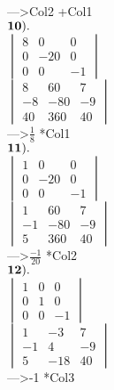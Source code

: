 \documentclass[]{article}
\begin{document}
---\textgreater{}Col2 +Col1\\

\(\bold{10).}\)\\

\(\begin{vmatrix} 8 & 0 & 0\\ 0 & -20 & 0\\ 0 & 0 & -1 \end{vmatrix}\)\\

\(\begin{vmatrix} 8 & 60 & 7\\ -8 & -80 & -9 \\ 40 & 360 & 40 \end{vmatrix}\)\\

---\textgreater{}\(\frac{1}{8}\) *Col1\\

\(\bold{11).}\)\\

\(\begin{vmatrix} 1 & 0 & 0\\ 0 & -20 & 0\\ 0 & 0 & -1 \end{vmatrix}\)\\

\(\begin{vmatrix} 1 & 60 & 7\\ -1 & -80 & -9 \\ 5 & 360 & 40 \end{vmatrix}\)\\

---\textgreater{}\(\frac{-1}{20}\) *Col2\\

\(\bold{12).}\)\\

\(\begin{vmatrix} 1 & 0 & 0\\ 0 & 1 & 0\\ 0 & 0 & -1 \end{vmatrix}\)\\

\(\begin{vmatrix} 1 & -3 & 7\\ -1 & 4 & -9 \\ 5 & -18 & 40 \end{vmatrix}\)\\

---\textgreater{}-1 *Col3\\
\end{document}
